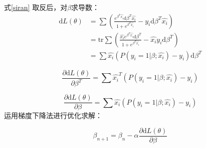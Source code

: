 \documentclass[a4paper]{article}
\begin{document}
	式\eqref{siran}	取反后，对$\beta$求导数：
	\begin{equation}\label{key}
	\begin{split}
	\mathrm{d}L(\theta)
	&=\sum \left( 
	\frac{e^{\beta^T\hat{x_i}} \mathrm{d}\beta^T\hat{x_i}}{1+e^{\beta^T\hat{x_i}} }
	- y_i \mathrm{d} \beta^T \hat{x_i}
	\right)\\
	&=\mathrm{tr}\sum \left( 
	\frac{\hat{x_i}e^{\beta^T\hat{x_i}} \mathrm{d}\beta^T}{1+e^{\beta^T\hat{x_i}} }
	- \hat{x_i}y_i \mathrm{d} \beta^T 
	\right)\\
	&=\sum \hat{x_i}(P(y_i=1|\beta;\hat{x_i})-y_i)\mathrm{d}\beta^T
	\end{split}	
	\end{equation}

	\begin{equation*}	
		\frac{\partial \mathrm{d}L(\theta)}{\partial \beta^T}=\sum \hat{x_i}^T(P(y_i=1|\beta;\hat{x_i})-y_i)		
	\end{equation*}
	
	\begin{equation}	
	\frac{\partial \mathrm{d}L(\theta)}{\partial \beta}=\sum \hat{x_i}(P(y_i=1|\beta;\hat{x_i})-y_i)		
	\end{equation}
	运用梯度下降法进行优化求解：
	
	\[
			\beta_{n+1}=\beta_{n}-\alpha\frac{\partial \mathrm{d}L(\theta)}{\partial \beta}
	\]
	
	
\end{document}
